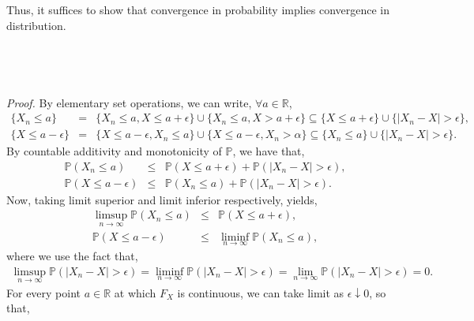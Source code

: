 \documentclass{article}
\begin{document}
Thus, it suffices to show that convergence in probability implies convergence in distribution.\\\\
\noindent{}\\\\\\
\textit{Proof.} By elementary set operations, we can write, $\forall a \in \mathbb{R}$,
\begin{eqnarray}
\nonumber
\{X_n \leq a\} &=& \{X_n \leq a, X \leq a+\epsilon\}\cup\{X_n \leq a, X > a+\epsilon\} \subseteq \{X \leq a+\epsilon\}\cup\{|X_n - X| > \epsilon\},\\
\nonumber
\{X \leq a-\epsilon\} &=& \{X \leq a-\epsilon, X_n \leq a\}\cup\{X \leq a-\epsilon, X_n > \alpha\} \subseteq \{X_n \leq a\}\cup\{|X_n - X| > \epsilon\}.
\end{eqnarray}
By countable additivity and monotonicity of $\mathbb{P}$, we have that,
\begin{eqnarray}
\nonumber
\mathbb{P}(X_n \leq a) &\leq& \mathbb{P}(X \leq a+\epsilon) + \mathbb{P}(|X_n - X| > \epsilon),\\
\nonumber
\mathbb{P}(X \leq a-\epsilon) &\leq& \mathbb{P}(X_n \leq a) + \mathbb{P}(|X_n - X| > \epsilon).
\end{eqnarray}
Now, taking limit superior and limit inferior respectively, yields,
\begin{eqnarray}
\nonumber
\limsup_{n\to\infty}\mathbb{P}(X_n \leq a) &\leq& \mathbb{P}(X \leq a+\epsilon),\\
\nonumber
\mathbb{P}(X \leq a-\epsilon) &\leq& \liminf_{n\to\infty}\mathbb{P}(X_n \leq a),
\end{eqnarray}
where we use the fact that,
\begin{eqnarray}
\nonumber
\limsup_{n\to\infty}\mathbb{P}(|X_n - X| > \epsilon) = \liminf_{n\to\infty}\mathbb{P}(|X_n - X| > \epsilon) = \lim_{n\to\infty}\mathbb{P}(|X_n - X| > \epsilon) = 0.
\end{eqnarray}
For every point $a\in\mathbb{R}$ at which $F_X$ is continuous, we can take limit as $\epsilon \downarrow 0$, so that,
\end{document}
